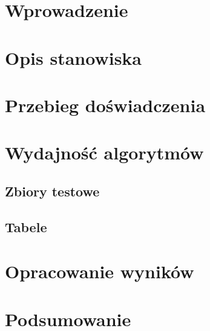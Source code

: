 \documentclass{sprawozdanie-agh}
\begin{document}

\stronatytulowa{}

\section{Wprowadzenie}

\section{Opis stanowiska}

\section{Przebieg doświadczenia}


\section{Wydajność algorytmów}
\subsection{Zbiory testowe}
% 
\subsection{Tabele}



\section{Opracowanie wyników}
\section{Podsumowanie}
\end{document}
